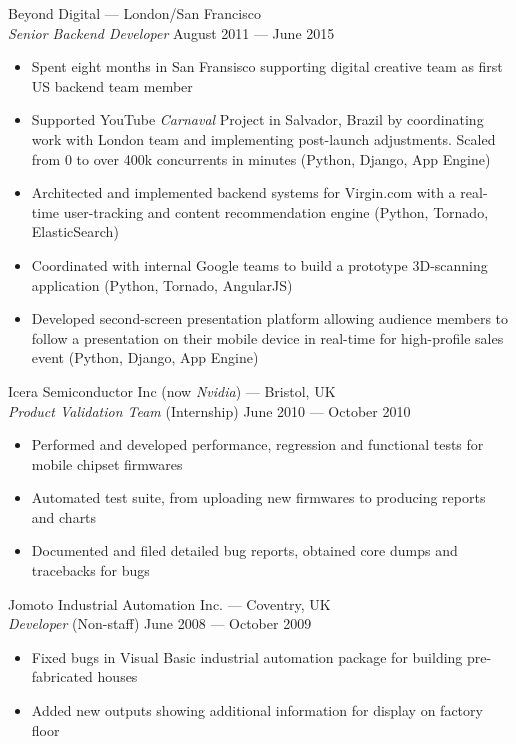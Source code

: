 \documentclass[margin, 10pt]{res}
\begin{document}
\begin{resume}
Beyond Digital --- London/San Francisco \\
{\sl Senior Backend Developer} \hfill August 2011 --- June 2015 \\

\begin{itemize} \itemsep -1pt
\item Spent eight months in San Fransisco supporting digital creative team as first US backend team member
\item Supported YouTube \textit{Carnaval} Project in Salvador, Brazil by coordinating work with London team and implementing post-launch adjustments. Scaled from 0 to over 400k concurrents in minutes (Python, Django, App Engine)
\item Architected and implemented backend systems for Virgin.com with a real-time user-tracking and content recommendation engine (Python, Tornado, ElasticSearch)
\item Coordinated with internal Google teams to build a prototype 3D-scanning application (Python, Tornado, AngularJS)
\item Developed second-screen presentation platform allowing audience members to follow a presentation on their mobile device in real-time for high-profile sales event (Python, Django, App Engine)
\end{itemize}

Icera Semiconductor Inc (now \textit{Nvidia}) --- Bristol, UK \\
{\sl Product Validation Team} \hfill (Internship) June 2010 --- October 2010 \\
\begin{itemize} \itemsep -1pt
\item Performed and developed performance, regression and functional tests for mobile chipset firmwares
\item Automated test suite, from uploading new firmwares to producing reports and charts
\item Documented and filed detailed bug reports, obtained core dumps and tracebacks for bugs
\end{itemize}

Jomoto Industrial Automation Inc. --- Coventry, UK \\
{\sl Developer} \hfill (Non-staff) June 2008 --- October 2009 \\
\begin{itemize} \itemsep -1pt
\item Fixed bugs in Visual Basic industrial automation package for building pre-fabricated houses
\item Added new outputs showing additional information for display on factory floor
\end{itemize}


\end{resume}
\end{document}
